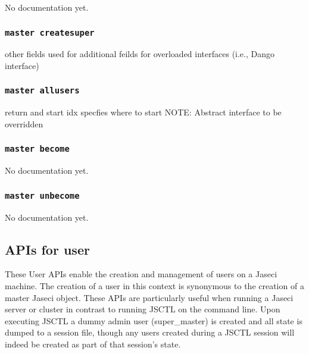 No documentation yet.

\subsubsection{\lstinline[basicstyle=\Large\ttfamily]$master createsuper$}

{other fields used for additional feilds for overloaded interfaces
(i.e., Dango interface)}
\subsubsection{\lstinline[basicstyle=\Large\ttfamily]$master allusers$}

{return and start idx specfies where to start
NOTE: Abstract interface to be overridden}
\subsubsection{\lstinline[basicstyle=\Large\ttfamily]$master become$}

{No documentation yet.}
\subsubsection{\lstinline[basicstyle=\Large\ttfamily]$master unbecome$}

{No documentation yet.}
\subsection{APIs for user}

\par
These User APIs enable the creation and management of users on a Jaseci machine.
The creation of a user in this context is synonymous to the creation of a master
Jaseci object. These APIs are particularly useful when running a Jaseci server
or cluster in contrast to running JSCTL on the command line. Upon executing JSCTL
a dummy admin user (super\_master) is created and all state is dumped to a session
file, though any users created during a JSCTL session will indeed be created as
part of that session's state.

